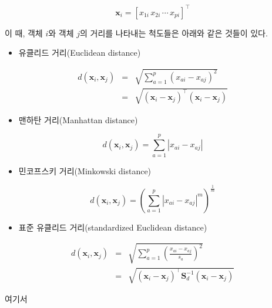 \documentclass[
]{book}
\providecommand{\tightlist}{%
  \setlength{\itemsep}{0pt}\setlength{\parskip}{0pt}}
\begin{document}
\begin{equation*}
\mathbf{x}_{i} = [x_{1i} \, x_{2i} \, \cdots \, x_{pi}]^\top
\end{equation*}

이 때, 객체 \(i\)와 객체 \(j\)의 거리를 나타내는 척도들은 아래와 같은 것들이 있다.

\begin{itemize}
\tightlist
\item
  유클리드 거리(Euclidean distance)
\end{itemize}

\begin{eqnarray*}
d(\mathbf{x}_i, \mathbf{x}_j) &=& \sqrt{\sum_{a = 1}^{p} \left(x_{ai} - x_{aj}\right)^2}\\
&=& \sqrt{(\mathbf{x}_i - \mathbf{x}_j)^\top (\mathbf{x}_i - \mathbf{x}_j)}
\end{eqnarray*}

\begin{itemize}
\tightlist
\item
  맨하탄 거리(Manhattan distance)
\end{itemize}

\begin{equation*}
d(\mathbf{x}_i, \mathbf{x}_j) = \sum_{a = 1}^{p} \left| x_{ai} - x_{aj} \right|
\end{equation*}

\begin{itemize}
\tightlist
\item
  민코프스키 거리(Minkowski distance)
\end{itemize}

\begin{equation*}
d(\mathbf{x}_i, \mathbf{x}_j) = \left( \sum_{a = 1}^{p} \left| x_{ai} - x_{aj} \right|^m \right)^\frac{1}{m}
\end{equation*}

\begin{itemize}
\tightlist
\item
  표준 유클리드 거리(standardized Euclidean distance)
\end{itemize}

\begin{eqnarray*}
d(\mathbf{x}_i, \mathbf{x}_j) &=& \sqrt{\sum_{a = 1}^{p} \left(\frac{x_{ai} - x_{aj}}{s_a}\right)^2}\\
&=& \sqrt{(\mathbf{x}_i - \mathbf{x}_j)^\top \mathbf{S}_d^{-1} (\mathbf{x}_i - \mathbf{x}_j)}
\end{eqnarray*}

여기서
\end{document}
